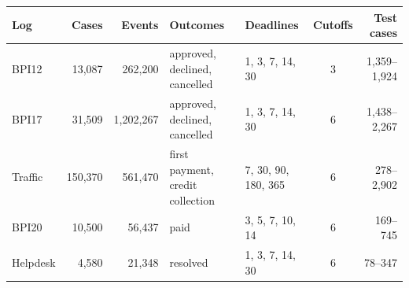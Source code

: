 \begin{tabular}{lrr>{\raggedright\arraybackslash}p{1.9cm}lcr}
\toprule
Log & Cases & Events & Outcomes & Deadlines & Cutoffs & Test cases \\
\midrule
BPI12 & 13,087 & 262,200 & approved, declined, cancelled & 1, 3, 7, 14, 30 & 3 & 1,359--1,924 \\
BPI17 & 31,509 & 1,202,267 & approved, declined, cancelled & 1, 3, 7, 14, 30 & 6 & 1,438--2,267 \\
Traffic & 150,370 & 561,470 & first payment, credit collection & 7, 30, 90, 180, 365 & 6 & 278--2,902 \\
BPI20 & 10,500 & 56,437 & paid & 3, 5, 7, 10, 14 & 6 & 169--745 \\
Helpdesk & 4,580 & 21,348 & resolved & 1, 3, 7, 14, 30 & 6 & 78--347 \\
\bottomrule
\end{tabular}
